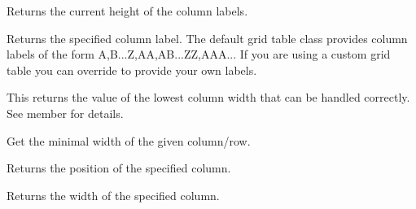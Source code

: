 \label{wxgridgetcollabelsize}


Returns the current height of the column labels.



\label{wxgridgetcollabelvalue}


Returns the specified column label. The default grid table class provides column labels of
the form A,B...Z,AA,AB...ZZ,AAA... If you are using a custom grid table you can override
 to provide
your own labels.



\label{wxgridgetcolminimalacceptablewidth}


This returns the value of the lowest column width that can be handled correctly. See
member  for details.



\label{wxgridgetcolminimalwidth}


Get the minimal width of the given column/row.



\label{wxgridgetcolpos}


Returns the position of the specified column.



\label{wxgridgetcolright}




\label{wxgridgetcolsize}


Returns the width of the specified column.



\label{wxgridgetdefaultcellalignment}

